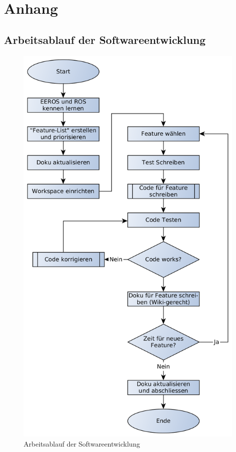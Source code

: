 \chapter{Anhang}

\section{Arbeitsablauf der Softwareentwicklung}
\label{anhangAblaufSoftwareentwicklung}

\begin{figure}[!ht]
\centering
\includegraphics[angle=0,height=0.8\textheight]{images/ablaufSoftwareentwicklung.png}
\caption{Arbeitsablauf der Softwareentwicklung}
\label{fig:arbeitsablaufSoftwareentwicklung}
\end{figure}



